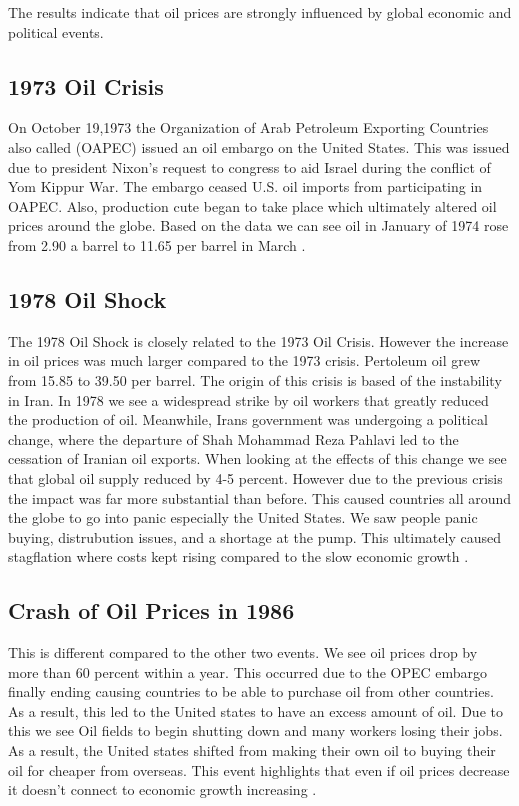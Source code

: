 The results indicate that oil prices are strongly influenced by global economic and political events.
\subsection{1973 Oil Crisis}
On October 19,1973 the Organization of Arab Petroleum Exporting Countries also called (OAPEC) issued an oil embargo on the United States. This was issued due to president Nixon's request to congress to aid Israel during the conflict of Yom Kippur War. The embargo ceased U.S. oil imports from participating in OAPEC. Also, production cute began to take place which ultimately altered oil prices around the globe. Based on the data we can see oil in January of 1974 rose from 2.90 a barrel to 11.65 per barrel in March \cite{oil1973}.
\subsection{1978 Oil Shock}
The 1978 Oil Shock is closely related to the 1973 Oil Crisis. However the increase in oil prices was much larger compared to the 1973 crisis. Pertoleum oil grew from 15.85 to 39.50 per barrel. The origin of this crisis is based of the instability in Iran. In 1978 we see a widespread strike by oil workers that greatly reduced the production of oil. Meanwhile, Irans government was undergoing a political change, where the departure of Shah Mohammad Reza Pahlavi led to the cessation of Iranian oil exports. When looking at the effects of this change we see that global oil supply reduced by 4-5 percent. However due to the previous crisis the impact was far more substantial than before. This caused countries all around the globe to go into panic especially the United States. We saw people panic buying, distrubution issues, and a shortage at the pump. This ultimately caused stagflation where costs kept rising compared to the slow economic growth \cite{oil1979}.
\subsection{Crash of Oil Prices in 1986}
This is different compared to the other two events. We see oil prices drop by more than 60 percent within a year. This occurred due to the OPEC embargo finally ending causing countries to be able to purchase oil from other countries. As a result, this led to the United states to have an excess amount of oil. Due to this we see Oil fields to begin shutting down and many workers losing their jobs. As a result, the United states shifted from making their own oil to buying their oil for cheaper from overseas. This event highlights that even if oil prices decrease it doesn't connect to economic growth increasing \cite{oil1986}.
